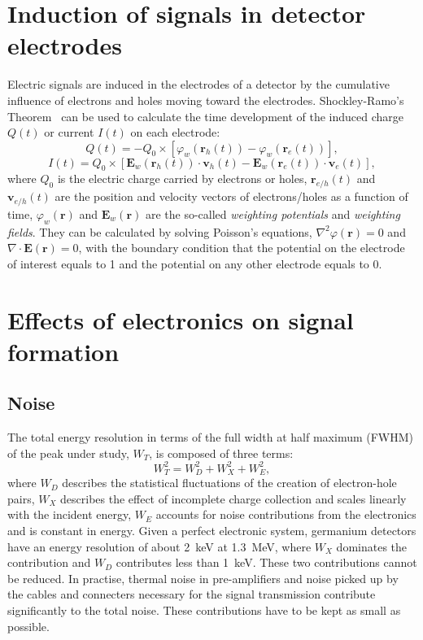 \section{Induction of signals in detector electrodes}
\label{sec:det:ramo}
Electric signals are induced in the electrodes of a detector by the cumulative influence of electrons and holes moving toward the electrodes. Shockley-Ramo's Theorem~\cite{Gat82, Rad88, He00} can be used to calculate the time development of the induced charge $Q(t)$ or current $I(t)$ on each electrode:
\begin{equation} 
  \label{eq:det:ramoq}
  Q(t) = -Q_{0} \times [\varphi_{w}(\mathbf{r}_{h}(t)) - \varphi_{w}(\mathbf{r}_{e}(t))],
\end{equation}
\begin{equation} 
  \label{eq:det:ramoi}
  I(t) = Q_{0} \times [\mathbf{E}_{w}(\mathbf{r}_{h}(t)) \cdot \mathbf{v}_{h}(t) - \mathbf{E}_{w}(\mathbf{r}_{e}(t)) \cdot \mathbf{v}_{e}(t)],
\end{equation}
where $Q_{0}$ is the electric charge carried by electrons or holes, $\mathbf{r}_{e/h}(t)$ and $\mathbf{v}_{e/h}(t)$ are the position and velocity vectors of electrons/holes as a function of time, $\varphi_{w}(\mathbf{r})$ and $\mathbf{E}_{w}(\mathbf{r})$ are the so-called \emph{weighting potentials} and \emph{weighting fields}. They can be calculated by solving Poisson's equations, $\nabla^{2} \varphi(\mathbf{r}) = 0$ and $\nabla \cdot \mathbf{E}(\mathbf{r}) = 0$, with the boundary condition that the potential on the electrode of interest equals to 1 and the potential on any other electrode equals to 0.

\section{Effects of electronics on signal formation}
\label{sec:det:elec}

\subsection{Noise}
\label{sec:det:noise}
The total energy resolution in terms of the full width at half maximum
(FWHM) of the peak under study, $W_{T}$, is composed of three terms:
\begin{equation}
W_{T}^{2} = W_{D}^{2} + W_{X}^{2} + W_{E}^{2},
\end{equation}
where $W_{D}$ describes the statistical fluctuations of the creation of electron-hole pairs, $W_{X}$ describes the effect of incomplete charge collection and scales linearly with the incident energy, $W_{E}$ accounts for noise contributions from the electronics and is constant in energy. Given a perfect electronic system, germanium detectors have an energy resolution of about 2~keV at 1.3~MeV, where $W_{X}$ dominates the contribution and $W_{D}$ contributes less than 1~keV. These two contributions cannot be reduced. In practise, thermal noise in pre-amplifiers and noise picked up by the cables and connecters necessary for the signal transmission contribute significantly to the total noise. These contributions have to be kept as small as possible.

